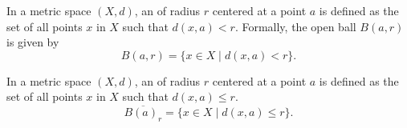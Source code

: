 \begin{definition}
    In a metric space \( (X, d) \), an  of radius \( r \) centered at a point \( a \) is defined as the set of all points \( x \) in \( X \) such that \( d(x, a) < r \). Formally, the open ball \( B(a, r) \) is given by
    \[
    B(a, r) = \{ x \in X \mid d(x, a) < r \}.
    \]
\end{definition}


\begin{definition}
    In a metric space \( (X, d) \), an  of radius \( r \) centered at a point \( a \) is defined as the set of all points \( x \) in \( X \) such that \( d(x, a) \leq r \).
    \[
    \overline{B(a)_r} = \{ x \in X \mid d(x, a) \leq r \}.
    \]
\end{definition}

